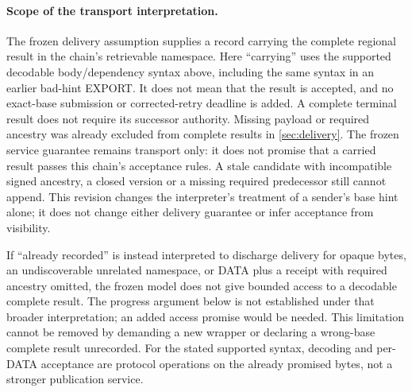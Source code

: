 \paragraph{Scope of the transport interpretation.}
\label{sec:transport-scope}
The frozen delivery assumption supplies a record carrying the complete
regional result in the chain's retrievable namespace. Here ``carrying''
uses the supported decodable body/dependency syntax above, including
the same syntax in an earlier bad-hint EXPORT. It does not mean that
the result is accepted, and no exact-base submission or corrected-retry
deadline is added. A complete terminal result does not require its
successor authority. Missing payload or required ancestry was already
excluded from complete results in \cref{sec:delivery}.
The frozen service guarantee remains transport only: it does not promise
that a carried result passes this chain's acceptance rules. A stale
candidate with incompatible signed ancestry, a closed version or a missing
required predecessor still cannot append. This revision changes the
interpreter's treatment of a sender's base hint alone; it does not
change either delivery guarantee or infer acceptance from visibility.

If ``already recorded'' is instead interpreted to discharge delivery
for opaque bytes, an undiscoverable unrelated namespace, or DATA plus
a receipt with required ancestry omitted, the frozen model does not
give bounded access to a decodable complete result. The progress
argument below is not established under that broader interpretation;
an added access promise would be needed. This limitation cannot be
removed by demanding a new wrapper or declaring a wrong-base complete
result unrecorded. For the stated supported syntax, decoding and
per-DATA acceptance are protocol operations on the already promised
bytes, not a stronger publication service.
